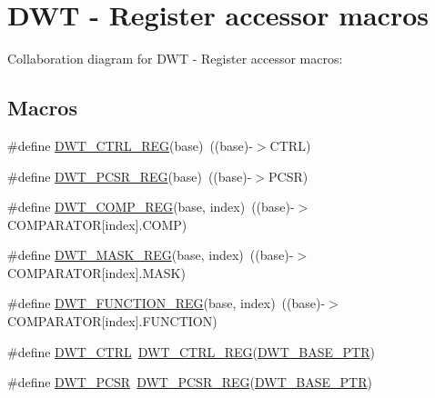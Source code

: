 \hypertarget{group___d_w_t___register___accessor___macros}{}\section{D\+WT -\/ Register accessor macros}
\label{group___d_w_t___register___accessor___macros}
Collaboration diagram for D\+WT -\/ Register accessor macros\+:
\subsection*{Macros}
\begin{DoxyCompactItemize}
\item 
\#define \hyperlink{group___d_w_t___register___accessor___macros_ga192b161c98f2e5a72cff8d88f20d3f69}{D\+W\+T\+\_\+\+C\+T\+R\+L\+\_\+\+R\+EG}(base)~((base)-\/$>$C\+T\+RL)
\item 
\#define \hyperlink{group___d_w_t___register___accessor___macros_ga3609d57752ff1006c962eed5c540e9b7}{D\+W\+T\+\_\+\+P\+C\+S\+R\+\_\+\+R\+EG}(base)~((base)-\/$>$P\+C\+SR)
\item 
\#define \hyperlink{group___d_w_t___register___accessor___macros_ga65ba817e15fd964c25a32b392e4bd8a6}{D\+W\+T\+\_\+\+C\+O\+M\+P\+\_\+\+R\+EG}(base,  index)~((base)-\/$>$C\+O\+M\+P\+A\+R\+A\+T\+OR\mbox{[}index\mbox{]}.C\+O\+MP)
\item 
\#define \hyperlink{group___d_w_t___register___accessor___macros_gadc3b258970e8d8b6fac9ed997705979b}{D\+W\+T\+\_\+\+M\+A\+S\+K\+\_\+\+R\+EG}(base,  index)~((base)-\/$>$C\+O\+M\+P\+A\+R\+A\+T\+OR\mbox{[}index\mbox{]}.M\+A\+SK)
\item 
\#define \hyperlink{group___d_w_t___register___accessor___macros_ga8c031182a80181fe644b6ae21491966a}{D\+W\+T\+\_\+\+F\+U\+N\+C\+T\+I\+O\+N\+\_\+\+R\+EG}(base,  index)~((base)-\/$>$C\+O\+M\+P\+A\+R\+A\+T\+OR\mbox{[}index\mbox{]}.F\+U\+N\+C\+T\+I\+ON)
\item 
\#define \hyperlink{group___d_w_t___register___accessor___macros_ga90b9ebedff8635727698afd2fa84b90a}{D\+W\+T\+\_\+\+C\+T\+RL}~\hyperlink{group___d_w_t___register___accessor___macros_ga192b161c98f2e5a72cff8d88f20d3f69}{D\+W\+T\+\_\+\+C\+T\+R\+L\+\_\+\+R\+EG}(\hyperlink{group___d_w_t___peripheral_ga3b46dfb2ea7946c6938028d879c82cb1}{D\+W\+T\+\_\+\+B\+A\+S\+E\+\_\+\+P\+TR})
\item 
\#define \hyperlink{group___d_w_t___register___accessor___macros_ga0c50769b8e0069fe1c5e06d1d356fad3}{D\+W\+T\+\_\+\+P\+C\+SR}~\hyperlink{group___d_w_t___register___accessor___macros_ga3609d57752ff1006c962eed5c540e9b7}{D\+W\+T\+\_\+\+P\+C\+S\+R\+\_\+\+R\+EG}(\hyperlink{group___d_w_t___peripheral_ga3b46dfb2ea7946c6938028d879c82cb1}{D\+W\+T\+\_\+\+B\+A\+S\+E\+\_\+\+P\+TR})

\end{DoxyCompactItemize}
